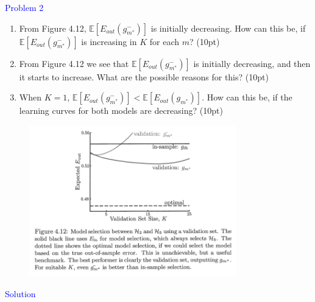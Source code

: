 \textcolor{blue}{Problem 2}
\begin{enumerate}
    \item From Figure 4.12, $\mathbb{E}[E_{out}(g^-_{m^*})]$ is initially decreasing. How can this be, if $\mathbb{E}[E_{out}(g^-_{m^*})]$ is increasing in $K$ for each $m$? (10pt)
    \item From Figure 4.12 we see that $\mathbb{E}[E_{out}(g^-_{m^*})]$ is initially decreasing, and then it starts to increase. What are the possible reasons for this? (10pt)
    \item When $K=1$, $\mathbb{E}[E_{out}(g^-_{m^*})]<\mathbb{E}[E_{out}(g_{m^*})]$. How can this be, if the learning curves for both models are decreasing? (10pt)
\end{enumerate}
\begin{figure}[htbp]
    \centering
    \includegraphics[width=0.8\textwidth]{../fig/figure412.png}
\end{figure} 
\par     
\textcolor{blue}{Solution}
















\newpage